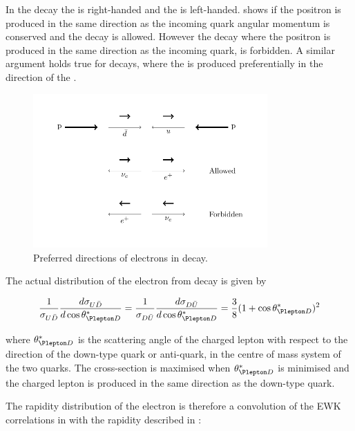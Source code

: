 In the \PWp decay the \Ppositron is right-handed and the \Pnue is left-handed.
 shows if the  positron is produced in the same direction
as the incoming \APdown quark angular momentum is conserved and the decay is
allowed.
However the decay where the positron is produced in the same direction as the
incoming \Pup quark, is forbidden.
A similar argument holds true for \PWm decays, where the \Pelectron is produced
preferentially in the direction of the \Pdown.

\begin{figure}[htb]
  \centering
  \includegraphics[width=0.8\textwidth]{w_decay_directions}
  \caption{Preferred directions of electrons in \Wenu decay.\cite{TODO}}
  \label{wbos:wspin}
\end{figure}

The actual distribution of the electron from \PWpm decay is given by\cite{}

\begin{equation}
  \frac{1}{\sigma_{U\bar{D}}}
  \frac{d \sigma_{U\bar{D}}}{d \cos \theta_{\Plepton D}^{\ast}}
  =
  \frac{1}{\sigma_{D\bar{U}}}
  \frac{d \sigma_{D\bar{U}}}{d \cos \theta_{\Plepton D}^{\ast}}
  =
  \frac{3}{8}(1+\cos \theta_{\Plepton D}^{\ast})^2
  \label{wbos:lepton}
\end{equation}

where $\theta_{\Plepton D}^{\ast}$ is the scattering angle of the charged
lepton with respect to the direction of the down-type quark or anti-quark, in
the centre of mass system of the two quarks. The cross-section is maximised when
$\theta_{\Plepton D}^{\ast}$ is minimised and the charged lepton is produced in
the same direction as the down-type quark.

The rapidity distribution of the electron is therefore a convolution of the
\ac{EWK} correlations in  with the \PW rapidity
described in :

